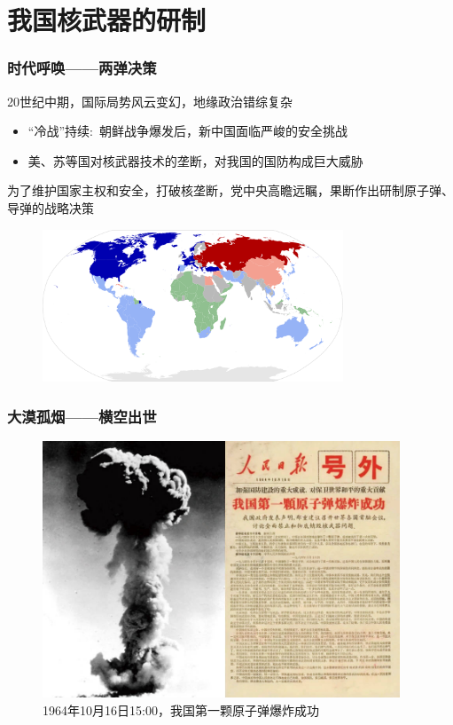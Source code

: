 \small

\section{我国核武器的研制}
\begin{frame}
    \frametitle{时代呼唤——两弹决策}
\textrm{20}世纪中期，国际局势风云变幻，地缘政治错综复杂
\begin{itemize}
		\setlength{\itemsep}{8pt}
	\item ``冷战''持续:~朝鲜战争爆发后，新中国面临严峻的安全挑战
	\item 美、苏等国对核武器技术的垄断，对我国的国防构成巨大威胁
\end{itemize}
为了维护国家主权和安全，打破核垄断，党中央高瞻远瞩，果断作出研制原子弹、导弹的战略决策
    \begin{figure}
        \includegraphics[width=0.8\textwidth]{Figures_History/Cold_War_Map-1959.png}
    \end{figure}
\end{frame}

\begin{frame}
    \frametitle{大漠孤烟——横空出世}
    \vspace{-0.4cm}
            \begin{figure}
                \includegraphics[width=0.95\textwidth]{Figures_History/People_Daily.jpeg}
		\caption{\tiny{\textrm{1964}年\textrm{10}月\textrm{16}日\textrm{15:00}，我国第一颗原子弹爆炸成功}}
            \end{figure}
\end{frame}

